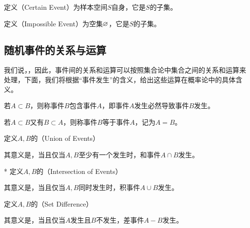 \begin{BoxDefinition}[必然事件]
    定义（Certain Event）为样本空间$S$自身，它是$S$的子集。
\end{BoxDefinition}
\begin{BoxDefinition}[不可能事件]
    定义（Impossible Event）为空集$\varnothing$，它是$S$的子集。
\end{BoxDefinition}

\subsection{随机事件的关系与运算}
我们说，，因此，事件间的关系和运算可以按照集合论中集合之间的关系和运算来处理，下面，我们将根据“事件发生”的含义，给出这些运算在概率论中的具体含义。

\begin{BoxDefinition}[事件的包含]
    若$A\subset B$，则称事件$B$包含事件$A$，即事件$A$发生必然导致事件$B$发生。
\end{BoxDefinition}

\begin{BoxDefinition}[事件的相等]
    若$A\subset B$又有$B\subset A$，则称事件$B$等于事件$A$，记为$A=B$。
\end{BoxDefinition}

\begin{BoxDefinition}[和事件]
    定义$A,B$的（Union of Events）
    其意义是，当且仅当$A,B$至少有一个发生时，和事件$A\cap B$发生。
\end{BoxDefinition}

\begin{BoxDefinition}[积事件]*
    定义$A,B$的（Intersection of Events）
    其意义是，当且仅当$A,B$同时发生时，积事件$A\cup B$发生。
\end{BoxDefinition}

\begin{BoxDefinition}[差事件]
    定义$A,B$的（Set Difference）
    其意义是，当且仅当$A$发生且$B$不发生，差事件$A-B$发生。
\end{BoxDefinition}

